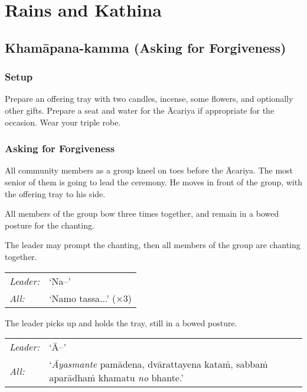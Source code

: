 \chapter{Rains and Kathina}

\section{Khamāpana-kamma (Asking for Forgiveness)}
\label{asking-forgiveness}

\subsection*{Setup}

Prepare an offering tray with two candles, incense, some flowers, and optionally
other gifts. Prepare a seat and water for the Ācariya if appropriate for the
occasion. Wear your triple robe.

\subsection*{Asking for Forgiveness}

All community members as a group kneel on toes before the Ācariya.
The most senior of them is going to lead the ceremony.
He moves in front of the group, with the offering tray to his side.

All members of the group bow three times together, and remain in a bowed posture
for the chanting.

The leader may prompt the chanting, then all members of the group are chanting
together.

\begin{tabular}{@{}L{3em}L{10em}@{}}
\hspace*{1.5em}\emph{Leader:} & ‘Na--’\\
\hspace*{1.5em}\emph{All:} & ‘Namo tassa...’ (×3)\\
\end{tabular}

The leader picks up and holds the tray, still in a bowed posture.

\begin{tabular}{@{}L{3em}L{18em}@{}}
\hspace*{1.5em}\emph{Leader:} & ‘Ā--’\\
\hspace*{1.5em}\emph{All:} & ‘\emph{Āyasmante} pamādena, dvārattayena kataṁ, sabbaṁ aparādhaṁ khamatu \emph{no} bhante.’\\
\end{tabular}

